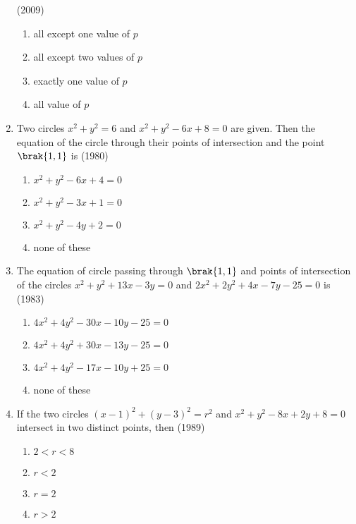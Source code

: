\begin{enumerate}
\hfill{(2009)}
\begin{multicols}{2}
\begin{enumerate}
\item all except one value of $p$
\item all except two values of $p$
\item exactly one value of $p$
\item all value of $p$
\end{enumerate}
\end{multicols}
    \item Two circles $x^{2} + y^{2} = 6$ and $x^{2} + y^{2}-6x +8=0$ are given. Then the equation of the circle through their points of intersection and the point $\brak{1, 1}$ is \hfill {(1980)}
    \begin{multicols}{2}
\begin{enumerate}
    	\item $x^{2}+y^{2}-6x+4=0$ 
    	\item $x^{2}+y^{2}-3x+1=0$
    	\item $x^{2}+y^{2}-4y+2=0$
    	\item none of these
    \end{enumerate}
\end{multicols}
    \item The equation of circle passing through $\brak{1, 1}$ and points of intersection of the circles $x^{2}+y^{2}+13x-3y=0$ and $2x^{2}+2y^{2}+4x-7y-25=0$ is
    \hfill {(1983)}
    \begin{multicols}{2}
\begin{enumerate}
    	\item $4x^{2}+4y^{2}-30x-10y-25=0$
    	\item $4x^{2}+4y^{2}+30x-13y-25=0$
    	\item $4x^{2}+4y^{2}-17x-10y+25=0$
    	\item none of these
    \end{enumerate}
\end{multicols}
    \item If the two circles $(x-1)^{2} + (y-3)^{2} = r^{2}$ and $x^{2}+y^{2}-8x+2y+8=0$ intersect in two distinct points,  then \hfill {(1989)} 
    \begin{multicols}{4}
\begin{enumerate}
    	\item $2<r<8$
    	\item $r<2$
    	\item $r=2$
    	\item $r>2$
    \end{enumerate}

\end{multicols}
\end{enumerate}
